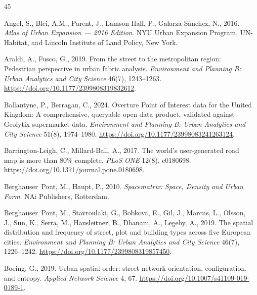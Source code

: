 \documentclass[review,authoryear]{elsarticle}
\begin{document}
\begin{thebibliography}{45}

  Angel, S., Blei, A.M., Parent, J., Lamson-Hall, P., Galarza S\'{a}nchez, N., 2016.
  \newblock \emph{Atlas of Urban Expansion --- 2016 Edition}.
  \newblock NYU Urban Expansion Program, UN-Habitat, and Lincoln Institute of Land Policy, New York.

  Araldi, A., Fusco, G., 2019.
  \newblock From the street to the metropolitan region: Pedestrian perspective in urban fabric analysis.
  \newblock \emph{Environment and Planning B: Urban Analytics and City Science} 46(7), 1243--1263.
  \newblock \url{https://doi.org/10.1177/2399808319832612}.

  Ballantyne, P., Berragan, C., 2024.
  \newblock Overture Point of Interest data for the United Kingdom: A comprehensive, queryable open data product, validated against Geolytix supermarket data.
  \newblock \emph{Environment and Planning B: Urban Analytics and City Science} 51(8), 1974--1980.
  \newblock \url{https://doi.org/10.1177/23998083241263124}.

  Barrington-Leigh, C., Millard-Ball, A., 2017.
  \newblock The world's user-generated road map is more than 80\% complete.
  \newblock \emph{PLoS ONE} 12(8), e0180698.
  \newblock \url{https://doi.org/10.1371/journal.pone.0180698}.

  Berghauser~Pont, M., Haupt, P., 2010.
  \newblock \emph{Spacematrix: Space, Density and Urban Form}.
  \newblock NAi Publishers, Rotterdam.

  Berghauser~Pont, M., Stavroulaki, G., Bobkova, E., Gil, J., Marcus, L., Olsson, J., Sun, K., Serra, M., Hausleitner, B., Dhanani, A., Legeby, A., 2019.
  \newblock The spatial distribution and frequency of street, plot and building types across five European cities.
  \newblock \emph{Environment and Planning B: Urban Analytics and City Science} 46(7), 1226--1242.
  \newblock \url{https://doi.org/10.1177/2399808319857450}.

  Boeing, G., 2019.
  \newblock Urban spatial order: street network orientation, configuration, and entropy.
  \newblock \emph{Applied Network Science} 4, 67.
  \newblock \url{https://doi.org/10.1007/s41109-019-0189-1}.


\end{thebibliography}
\end{document}
